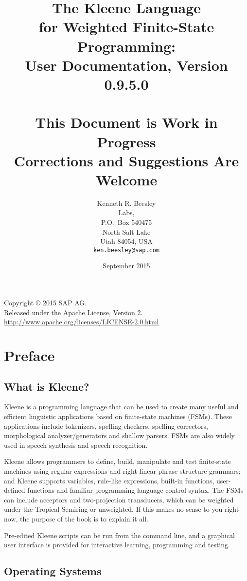 \documentclass[letterpaper,12pt]{book}
\title{The Kleene Language\\
for Weighted Finite-State Programming:\\
{\Large User Documentation, Version 0.9.5.0}\\
\mbox{}\\
{\Large This Document is Work in Progress\\
Corrections and Suggestions Are Welcome}}
\author{Kenneth R. Beesley\\
\init{sap} Labs, \init{LLC}\\
P.O.~Box 540475\\
North Salt Lake\\
Utah 84054, USA\\
\texttt{ken.beesley@sap.com}}
\date{September 2015}
\providecommand{\init}{}\renewcommand{\init}{\MakeUppercase}
\newcommand{\Kleene}{Kleene}
\newcommand{\fsm}{\init{fsm}}
\begin{document}
\VerbatimFootnotes

\maketitle

\null\vfill
\thispagestyle{empty}
\begin{center}
Copyright \copyright{} 2015 SAP AG.\\
Released under the Apache License, Version 2.\\
\url{http://www.apache.org/licenses/LICENSE-2.0.html}
\end{center}
\newpage

\frontmatter

\section*{Preface}

\subsection*{What is Kleene?}

Kleene is a programming language that can be used to create many useful and
efficient linguistic applications based on finite-state machines
(\fsm{}s).  These applications include tokenizers, spelling checkers, spelling correctors,
morphological analyzer/generators and shallow parsers.  
\fsm{}s are also widely used
in speech synthesis and speech recognition.

\Kleene{} allows programmers to define, build, manipulate and test 
finite-state machines using regular expressions
and right-linear phrase-structure grammars; and Kleene supports variables,
rule-like expressions, built-in functions, user-defined 
functions and familiar programming-language control
syntax.  The \fsm{}s can include acceptors and two-projection
transducers, which can be weighted under the Tropical Semiring or unweighted.
If this makes no sense to you right now, the purpose of the book is to
explain it all.

Pre-edited \Kleene{} scripts can be run from the command line, and a
graphical user interface is provided for interactive learning, programming
and testing.

\subsection*{Operating Systems}
\end{document}
